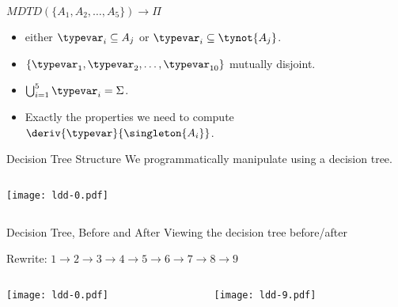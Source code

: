 \begin{frame}[t]{$MDTD( \{A_1, A_2, \ldots, A_5\})\to\Pi$}
  \scalebox{0.65}{\usebox\boxforestAnu}
  
  \medskip
  
  \begin{itemize}
  \item {} either $\typevar_i \subseteq A_j$ or $\typevar_i \subseteq \tynot{A_j}$.
  \item{} $\{\typevar_1, \typevar_2, \ldots, \typevar_{10}\}$ mutually disjoint.
  \item {} $\bigcup_{i=1}^5\typevar_i=\Sigma$.
  \item Exactly the properties we need to compute $\deriv{\typevar}{\singleton{A_i}}$.
  \end{itemize}
\end{frame}




\begin{frame}{Decision Tree Structure}
  We programmatically manipulate  using a decision tree.

  \begin{columns}
    \begin{column}{0.5\textwidth}
      \texttt{[image: ldd-0.pdf]}
    \end{column}
    \begin{column}{0.5\textwidth}  %
      \usebox\typecaseAbox
    \end{column}    
  \end{columns}
\end{frame}

\begin{frame}{Decision Tree, Before and After}
  Viewing the decision tree before/after

  \medskip
  
  Rewrite: $1 \to 2\to 3\to 4\to 5\to 6\to 7\to 8\to 9$

  \medskip
  
  \begin{columns}
    \begin{column}{0.5\textwidth}
      \texttt{[image: ldd-0.pdf]}
    \end{column}
    \begin{column}{0.5\textwidth}  %
      \texttt{[image: ldd-9.pdf]}
    \end{column}
  \end{columns}
\end{frame}


